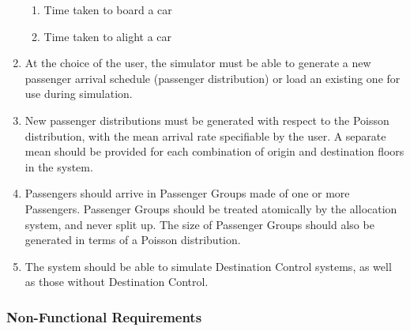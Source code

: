 \documentclass{UoYCSproject}
\begin{document}
\begin{enumerate}
		\begin{enumerate}
			\item Time taken to board a car
			\item Time taken to alight a car
		\end{enumerate}
		\item At the choice of the user, the simulator must be able to generate a new passenger arrival schedule (passenger distribution) or load an existing one for use during simulation.
		\item New passenger distributions must be generated with respect to the Poisson distribution, with the mean arrival rate specifiable by the user.  A separate mean should be provided for each combination of origin and destination floors in the system.
		\item Passengers should arrive in Passenger Groups made of one or more Passengers.  Passenger Groups should be treated atomically by the allocation system, and never split up.  The size of Passenger Groups should also be generated in terms of a Poisson distribution.
		\item The system should be able to simulate Destination Control systems, as well as those without Destination Control.
	\end{enumerate}

\subsubsection{Non-Functional Requirements}
\end{document}
